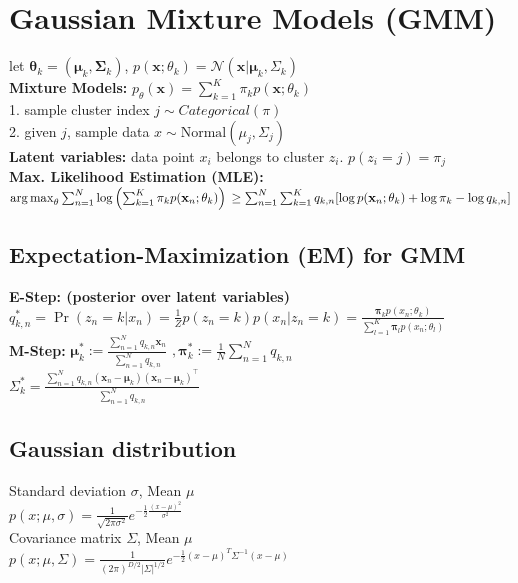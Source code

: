 \section{Gaussian Mixture Models (GMM)}
let $\boldsymbol{\theta}_k = (\boldsymbol{\mu}_k, \boldsymbol{\Sigma}_k)$, $p(\mathbf{x};\theta_k) = \mathcal{N}(\mathbf{x} | \boldsymbol{\mu}_k, \Sigma_k)$\\
\textbf{Mixture Models:} $p_\theta(\mathbf{x}) = \sum_{k=1}^K \pi_k p(\mathbf{x};\theta_k)$\\
1. sample cluster index $j \sim Categorical(\pi)$\\
2. given $j$, sample data $x \sim \text{Normal}(\mu_j, \Sigma_j)$ \\
\textbf{Latent variables:} data point $x_i$ belongs to cluster $z_i$. $p(z_i=j)=\pi_j$ \\
\textbf{Max. Likelihood Estimation (MLE):}\\
$\operatorname*{arg\,max}_\theta\sum_{n=1}^N \log \left( \sum_{k=1}^K \pi_k p(\mathbf{x}_n;\theta_k)\right)\\
\ge \sum_{n=1}^N \sum_{k=1}^K{q_{k,n}[\log p(\mathbf{x}_n;\theta_k) + \log \pi_k - \log q_{k,n}]}$\\

\subsection*{Expectation-Maximization (EM) for GMM}
\textbf{E-Step: (posterior over latent variables)}\\
$q_{k,n}^* = \operatorname{Pr}(z_n=k|x_n) = \frac{1}{Z}p(z_n=k)p(x_n|z_n=k) = \frac{\boldsymbol{\pi}_k p(x_n;\theta_k)}{\sum_{l=1}^K \boldsymbol{\pi}_l p(x_n;\theta_l)}$ \\
\textbf{M-Step: } $\boldsymbol{\mu}_k^* := \frac{\sum_{n=1}^N q_{k,n} \mathbf{x}_n}{\sum_{n=1}^N q_{k,n}}$
$, \boldsymbol{\pi}_k^* := \frac{1}{N} \sum_{n=1}^N q_{k,n}$\\
$\Sigma_k^* = \frac{\sum_{n=1}^N q_{k, n} (\mathbf{x}_n - \boldsymbol{\mu}_k)(\mathbf{x}_n - \boldsymbol{\mu}_k)^\top}{\sum_{n=1}^N q_{k,n}}$

\subsection*{Gaussian distribution}
Standard deviation $\sigma$, Mean $\mu$ \\
$p(x;\mu, \sigma) = \frac{1}{\sqrt{2\pi \sigma^2}} e^{- \frac{1}{2} \frac{(x-\mu)^2}{\sigma^2}}$\\
Covariance matrix $\Sigma$, Mean $\mu$ \\
$p(x;\mu, \Sigma) = \frac{1}{(2\pi)^{D/2} |\Sigma|^{1/2}} e^{- \frac{1}{2} (x-\mu)^T \Sigma^{-1} (x-\mu)}$


